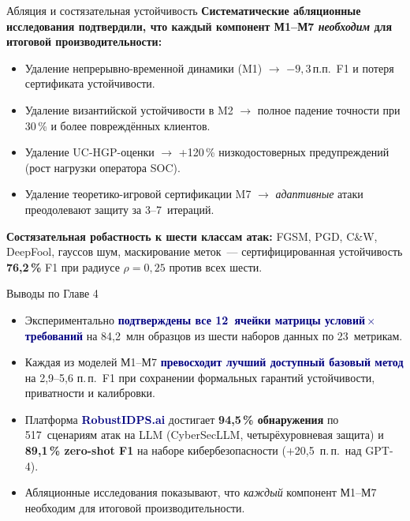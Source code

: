 \documentclass[10pt,aspectratio=169]{beamer}
\newcommand{\hl}[1]{\textcolor{accent}{\textbf{#1}}}
\newcommand{\bn}[1]{\textcolor{navy}{\textbf{#1}}}
\begin{document}
\begin{frame}{Абляция и состязательная устойчивость}
\small
\textbf{Систематические абляционные исследования подтвердили,
что каждый компонент М1--М7 \emph{необходим} для итоговой
производительности:}
\smallskip
\begin{itemize}\setlength\itemsep{2pt}
\item Удаление непрерывно-временной динамики (M1) $\to$
$-9{,}3$\,п.п.\ F1 и потеря сертификата устойчивости.
\item Удаление византийской устойчивости в M2 $\to$ полное
падение точности при 30\,\% и более повреждённых клиентов.
\item Удаление UC-HGP-оценки $\to$ +120\,\% низкодостоверных
предупреждений (рост нагрузки оператора SOC).
\item Удаление теоретико-игровой сертификации M7 $\to$
\emph{адаптивные} атаки преодолевают защиту за 3--7~итераций.
\end{itemize}
\smallskip

\textbf{Состязательная робастность к шести классам атак:}
FGSM, PGD, C\&W, DeepFool, гауссов шум, маскирование меток~---
сертифицированная устойчивость
\hl{76{,}2\,\%} F1 при радиусе $\rho=0{,}25$ против всех шести.
\end{frame}

\begin{frame}{Выводы по Главе 4}
\small
\begin{itemize}\setlength\itemsep{4pt}
\item Экспериментально \bn{подтверждены все 12~ячейки матрицы
условий\,$\times$\,требований} на 84{,}2~млн образцов из
шести наборов данных по 23~метрикам.
\item Каждая из моделей М1--М7 \bn{превосходит лучший
доступный базовый метод} на 2{,}9--5{,}6 п.\,п.\ F1 при
сохранении формальных гарантий устойчивости, приватности и
калибровки.
\item Платформа \bn{RobustIDPS.ai} достигает
\hl{94{,}5\,\% обнаружения} по 517~сценариям атак на LLM
(CyberSecLLM, четырёхуровневая защита) и
\hl{89{,}1\,\% zero-shot F1} на наборе кибербезопасности
(+20{,}5~п.\,п.\ над GPT-4).
\item Абляционные исследования показывают, что \emph{каждый}
компонент М1--М7 необходим для итоговой производительности.
\end{itemize}
\end{frame}
\end{document}
